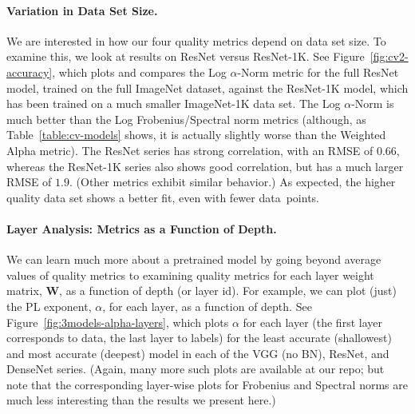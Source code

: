 \vspace{-1mm}
\paragraph{Variation in Data Set Size.}

We are interested in how our four quality metrics depend on data set size.
To examine this, we look at results on ResNet versus ResNet-1K.
See Figure~\ref{fig:cv2-accuracy}, which plots and compares the Log $\alpha$-Norm metric 
for the full ResNet model, trained on the full ImageNet dataset, against the ResNet-1K model, which has been trained on a much smaller ImageNet-1K data set.
The Log $\alpha$-Norm is much better than the Log Frobenius/Spectral norm metrics (although, as Table~\ref{table:cv-models} shows, it is actually slightly worse than the Weighted Alpha metric).
The ResNet series has strong correlation, with an RMSE of $0.66$, whereas the ResNet-1K series also shows good correlation, but has a much larger RMSE of $1.9$.
(Other metrics exhibit similar behavior.)
As expected, the higher quality data set shows a better fit, even with fewer data~points.


\vspace{-1mm}
\paragraph{Layer Analysis: Metrics as a Function of Depth.}

We can learn much more about a pretrained model by going beyond average values of quality metrics to examining quality metrics for each layer weight matrix, $\mathbf{W}$, as a function of depth (or layer id).  %
For example, we can 
plot (just) the PL exponent, $\alpha$, for each layer, %
as a function of depth.
%
See Figure~\ref{fig:3models-alpha-layers}, which plots $\alpha$ for each layer (the first layer corresponds to data, the last layer to labels) for the least accurate (shallowest) and most accurate (deepest) model in each of the VGG (no BN), ResNet, and DenseNet series.
(Again, many more such plots are available at our repo; but note that the corresponding layer-wise plots for Frobenius and Spectral norms are much less interesting than the results we present here.)

